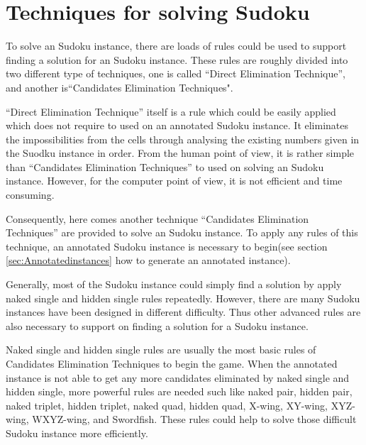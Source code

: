 \documentclass[11pt]{report}
\begin{document}
\chapter{Techniques for solving Sudoku}
\label{sec:Techniques}

To solve an Sudoku instance, there are loads of rules could be used to support finding a solution for an Sudoku instance. These rules are roughly divided into two different type of techniques, one is called “Direct Elimination Technique”, and another is“Candidates Elimination Techniques".

``Direct Elimination Technique'' itself is a rule which could be easily applied which does not require to used on an annotated Sudoku instance. It eliminates the impossibilities from the cells through analysing the existing numbers given in the Suodku instance in order. From the human point of view, it is rather simple than ``Candidates Elimination Techniques'' to used on solving an Sudoku instance. However, for the computer point of view, it is not efficient and time consuming.

Consequently, here comes another technique ``Candidates Elimination Techniques'' are provided to solve an Sudoku instance. To apply any rules of this technique, an annotated Sudoku instance is necessary to begin(see section \ref{sec:Annotatedinstances} how to generate an annotated instance). 

Generally, most of the Sudoku instance could simply find a solution by apply naked single and hidden single rules repeatedly. However, there are many Sudoku instances have been designed in different difficulty. Thus other advanced rules are also necessary to support on finding a solution for a Sudoku instance.

Naked single and hidden single rules are usually the most basic rules of Candidates Elimination Techniques to begin the game. When the annotated instance is not able to get any more candidates eliminated by naked single and hidden single, more powerful rules are needed such like naked pair, hidden pair, naked triplet, hidden triplet, naked quad, hidden quad, X-wing, XY-wing, XYZ-wing, WXYZ-wing, and Swordfish. These rules could help to solve those difficult Sudoku instance more efficiently.
\end{document}
